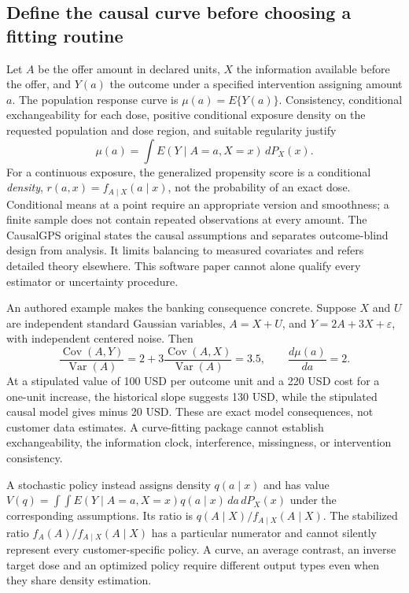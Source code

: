 \subsection{Define the causal curve before choosing a fitting routine}
Let $A$ be the offer amount in declared units, $X$ the information available
before the offer, and $Y(a)$ the outcome under a specified intervention assigning
amount $a$. The population response curve is $\mu(a)=E\{Y(a)\}$. Consistency,
conditional exchangeability for each dose, positive conditional exposure density
on the requested population and dose region, and suitable regularity justify
\[
 \mu(a)=\int E(Y\mid A=a,X=x)\,dP_X(x).
\]
For a continuous exposure, the generalized propensity score is a conditional
\emph{density}, $r(a,x)=f_{A\mid X}(a\mid x)$, not the probability of an exact
dose. Conditional means at a point require an appropriate version and
smoothness; a finite sample does not contain repeated observations at every
amount. The CausalGPS original states the causal assumptions and separates
outcome-blind design from analysis. It limits balancing to measured covariates
and refers detailed theory elsewhere. This software paper cannot alone qualify
every estimator or uncertainty procedure.~\citep{exec24_dose_original}

An authored example makes the banking consequence concrete. Suppose $X$ and
$U$ are independent standard Gaussian variables, $A=X+U$, and
$Y=2A+3X+\varepsilon$, with independent centered noise. Then
\[
 \frac{\operatorname{Cov}(A,Y)}{\operatorname{Var}(A)}
 =2+3\frac{\operatorname{Cov}(A,X)}{\operatorname{Var}(A)}=3.5,
 \qquad \frac{d\mu(a)}{da}=2.
\]
At a stipulated value of 100 USD per outcome unit and a 220 USD cost for a
one-unit increase, the historical slope suggests 130 USD, while the stipulated
causal model gives minus 20 USD. These are exact model consequences, not customer
data estimates. A curve-fitting package cannot establish exchangeability, the
information clock, interference, missingness, or intervention consistency.
\citep{exec24_dose_contract}

A stochastic policy instead assigns density $q(a\mid x)$ and has value
$V(q)=\int\!\int E(Y\mid A=a,X=x)q(a\mid x)\,da\,dP_X(x)$ under the
corresponding assumptions. Its ratio is $q(A\mid X)/f_{A\mid X}(A\mid X)$.
The stabilized ratio $f_A(A)/f_{A\mid X}(A\mid X)$ has a particular numerator
and cannot silently represent every customer-specific policy. A curve, an
average contrast, an inverse target dose and an optimized policy require
different output types even when they share density estimation.
\citep{exec24_dose_contract}

